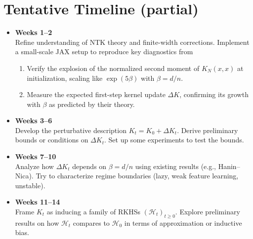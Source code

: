 \documentclass[11pt,a4paper]{article}
\begin{document}
\section{Tentative Timeline (partial)}\label{sec:Tentative Timeline} %
\begin{itemize}
	\item \textbf{Weeks 1--2} \\
	      Refine understanding of NTK theory and finite-width corrections.
	      Implement a small-scale JAX setup to reproduce key diagnostics from
	      \citet{haninNica2019finite}
	      \begin{enumerate}
		      \item Verify the explosion of the normalized second moment of $K_N(x,x)$ at initialization,
		            scaling like $\exp(5\beta)$ with $\beta = d/n$.
		      \item Measure the expected first-step kernel update $\Delta K$, confirming its growth with $\beta$
		            as predicted by their theory.
	      \end{enumerate}

	\item \textbf{Weeks 3--6} \\
	      Develop the perturbative description $K_t = K_0 + \Delta K_t$.
	      Derive preliminary bounds or conditions on $\Delta K_t$. Set up some
	      experiments to test the bounds.

	\item \textbf{Weeks 7--10} \\
	      Analyze how $\Delta K_t$ depends on $\beta = d/n$ using existing
	      results (e.g., Hanin--Nica). Try to characterize regime boundaries
	      (lazy, weak feature learning, unstable).

	\item \textbf{Weeks 11--14} \\
	      Frame $K_t$ as inducing a family of RKHSs $(\mathcal H_t)_{t\ge 0}$.
	      Explore preliminary results on how $\mathcal H_t$ compares to $\mathcal H_0$ in terms of approximation or inductive bias.

\end{itemize}



\end{document}

